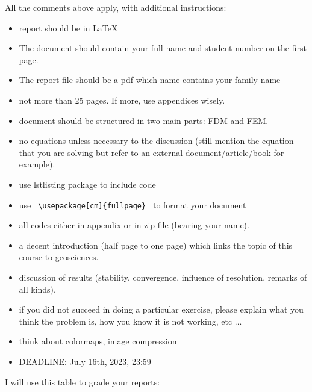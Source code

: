 All the comments above apply, with additional instructions:
\begin{itemize}
\item report should be in \LaTeX 
\item The document should contain your full name and student number on the first page. 
\item The report file should be a pdf which name contains your family name
\item not more than 25 pages. If more, use appendices wisely.
\item document should be structured in two main parts: FDM and FEM.
\item no equations unless necessary to the discussion (still mention the equation that 
you are solving but refer to an external document/article/book for example).
\item use lstlisting package to include code
\item use {\verb| \usepackage[cm]{fullpage} |} to format your document
\item all codes either in appendix or in zip file (bearing your name).
\item a decent introduction (half page to one page) which links the topic of this course to geosciences.
\item discussion of results (stability, convergence, influence of resolution, remarks of all kinds).
\item if you did not succeed in doing a particular exercise, please explain what you think the problem is, 
how you know it is not working, etc ...
\item think about colormaps, image compression
\item DEADLINE: July 16th, 2023, 23:59 
\end{itemize}


I will use this table to grade your reports:

\vspace{2cm}


